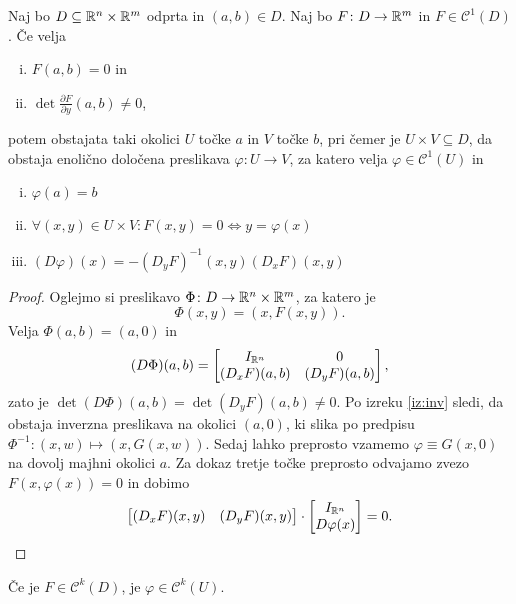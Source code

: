 \begin{izrek}
\label{iz:imp}
Naj bo $D \subseteq \mathbb{R}^n \times \mathbb{R}^m$ odprta in $(a,b) \in D$.
Naj bo $F \colon D\to \mathbb{R}^m$ in $F \in \mathcal{C}^1(D)$. Če velja

\begin{enumerate}[i)]
\item $F(a,b) = 0$ in
\item $\det \frac{\partial F}{\partial y}(a,b) \ne 0$,
\end{enumerate}

potem obstajata taki okolici $U$ točke $a$ in $V$ točke $b$, pri
čemer je $U \times V \subseteq D$, da obstaja enolično določena
preslikava $\varphi \colon U \to V$, za katero velja
$\varphi \in \mathcal{C}^1(U)$ in
\begin{enumerate}[i)]
\item $\varphi(a) = b$
\item $\forall (x,y) \in U \times V \colon F(x,y) = 0 \iff
y = \varphi(x)$
\item $(D\varphi)(x) = -(D_yF)^{-1}(x,y) (D_xF)(x,y)$
\end{enumerate}
\end{izrek}

\begin{proof}
Oglejmo si preslikavo $\Phi \colon D \to \mathbb{R}^n \times \mathbb{R}^m$, za
katero je
\[
\Phi(x,y) = (x, F(x,y)).
\]
Velja $\Phi(a,b) = (a,0)$ in
\[
(D\Phi)(a,b) =
\begin{bmatrix}
I_{\mathbb{R}^n}    & 0           \\ 
(D_xF)(a,b) & (D_yF)(a,b)
\end{bmatrix},
\]
zato je $\det(D\Phi)(a,b) = \det (D_yF)(a,b) \ne 0$. Po izreku
\ref{iz:inv} sledi, da obstaja inverzna preslikava na okolici
$(a,0)$, ki slika po predpisu
$\Phi^{-1} \colon (x,w) \mapsto (x, G(x,w))$. Sedaj lahko
preprosto vzamemo $\varphi \equiv G(x,0)$ na dovolj majhni
okolici $a$. Za dokaz tretje točke preprosto odvajamo zvezo
$F(x,\varphi(x)) = 0$ in dobimo
\[
\begin{bmatrix}
(D_xF)(x,y) & (D_yF)(x,y)
\end{bmatrix} 
\cdot
\begin{bmatrix}
I_{\mathbb{R}^n}    \\
D\varphi(x)
\end{bmatrix}
= 0. \qedhere
\]
\end{proof}

\begin{opomba}
Če je $F \in \mathcal{C}^k(D)$, je $\varphi \in \mathcal{C}^k(U)$.
\end{opomba}

